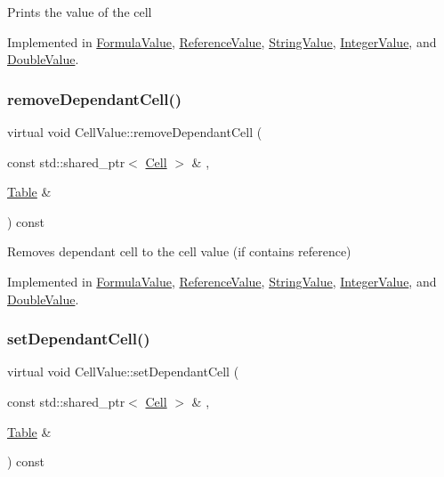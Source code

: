 Prints the value of the cell 

Implemented in \hyperlink{classFormulaValue_a62217eb27ea02ca26f7636afb8f75b73}{Formula\+Value}, \hyperlink{classReferenceValue_a24850974f891910d5f9298db29239e1e}{Reference\+Value}, \hyperlink{classStringValue_a2b7b078d04a0c9994013adb0cc3e699a}{String\+Value}, \hyperlink{classIntegerValue_a3cf6394dee28b404446eff2c6b727634}{Integer\+Value}, and \hyperlink{classDoubleValue_a9c11fc60aedef2db2f43958c2e73eb95}{Double\+Value}.

\mbox{\label{classCellValue_a72b4390db6c53e525550cefade66fb0e}} 
\subsubsection{\texorpdfstring{remove\+Dependant\+Cell()}{removeDependantCell()}}
{\footnotesize\ttfamily virtual void Cell\+Value\+::remove\+Dependant\+Cell (\begin{DoxyParamCaption}\item[{const std\+::shared\+\_\+ptr$<$ \hyperlink{classCell}{Cell} $>$ \&}]{,  }\item[{\hyperlink{classTable}{Table} \&}]{ }\end{DoxyParamCaption}) const\hspace{0.3cm}{\ttfamily [pure virtual]}}

Removes dependant cell to the cell value (if contains reference) 

Implemented in \hyperlink{classFormulaValue_a7081172a6793644e3375c81f76ed1ba8}{Formula\+Value}, \hyperlink{classReferenceValue_a8cfd2b3e5f8d18b50ab523e7f9c8ad02}{Reference\+Value}, \hyperlink{classStringValue_aa57e3e4038a415eeb97e09ff8a7bbe35}{String\+Value}, \hyperlink{classIntegerValue_a093c194fb370dac25a867980bc4a4eca}{Integer\+Value}, and \hyperlink{classDoubleValue_a7ec7477ff3eb36e7e012912c674850e4}{Double\+Value}.

\mbox{\label{classCellValue_ad2437fb3d4d4a96d9a76c857b3d04231}} 
\subsubsection{\texorpdfstring{set\+Dependant\+Cell()}{setDependantCell()}}
{\footnotesize\ttfamily virtual void Cell\+Value\+::set\+Dependant\+Cell (\begin{DoxyParamCaption}\item[{const std\+::shared\+\_\+ptr$<$ \hyperlink{classCell}{Cell} $>$ \&}]{,  }\item[{\hyperlink{classTable}{Table} \&}]{ }\end{DoxyParamCaption}) const\hspace{0.3cm}{\ttfamily [pure virtual]}}

